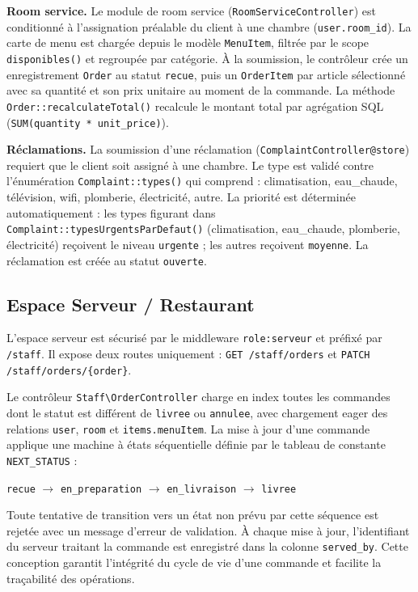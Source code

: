 \documentclass[12pt,a4paper]{report}
\begin{document}
\textbf{Room service.} Le module de room service (\texttt{RoomServiceController})
est conditionné à l'assignation préalable du client à une chambre
(\texttt{user.room\_id}). La carte de menu est chargée depuis le modèle
\texttt{MenuItem}, filtrée par le scope \texttt{disponibles()} et regroupée
par catégorie. À la soumission, le contrôleur crée un enregistrement
\texttt{Order} au statut \texttt{recue}, puis un \texttt{OrderItem} par
article sélectionné avec sa quantité et son prix unitaire au moment de la
commande. La méthode \texttt{Order::recalculateTotal()} recalcule le montant
total par agrégation SQL (\texttt{SUM(quantity * unit\_price)}).

\textbf{Réclamations.} La soumission d'une réclamation (\texttt{ComplaintController@store})
requiert que le client soit assigné à une chambre. Le type est validé contre
l'énumération \texttt{Complaint::types()} qui comprend : climatisation,
eau\_chaude, télévision, wifi, plomberie, électricité, autre. La priorité
est déterminée automatiquement : les types figurant dans
\texttt{Complaint::typesUrgentsParDefaut()} (climatisation, eau\_chaude,
plomberie, électricité) reçoivent le niveau \texttt{urgente} ; les autres
reçoivent \texttt{moyenne}. La réclamation est créée au statut
\texttt{ouverte}.

\subsection{Espace Serveur / Restaurant}

L'espace serveur est sécurisé par le middleware \texttt{role:serveur} et
préfixé par \texttt{/staff}. Il expose deux routes uniquement :
\texttt{GET /staff/orders} et \texttt{PATCH /staff/orders/\{order\}}.

Le contrôleur \texttt{Staff\textbackslash{}OrderController} charge en index
toutes les commandes dont le statut est différent de \texttt{livree} ou
\texttt{annulee}, avec chargement eager des relations \texttt{user}, 
\texttt{room} et \texttt{items.menuItem}. La mise à jour d'une commande
applique une machine à états séquentielle définie par le tableau de
constante \texttt{NEXT\_STATUS} :

\begin{center}
\texttt{recue} $\rightarrow$ \texttt{en\_preparation} $\rightarrow$
\texttt{en\_livraison} $\rightarrow$ \texttt{livree}
\end{center}

Toute tentative de transition vers un état non prévu par cette séquence
est rejetée avec un message d'erreur de validation. À chaque mise à jour,
l'identifiant du serveur traitant la commande est enregistré dans la colonne
\texttt{served\_by}. Cette conception garantit l'intégrité du cycle de vie
d'une commande et facilite la traçabilité des opérations.
\end{document}
